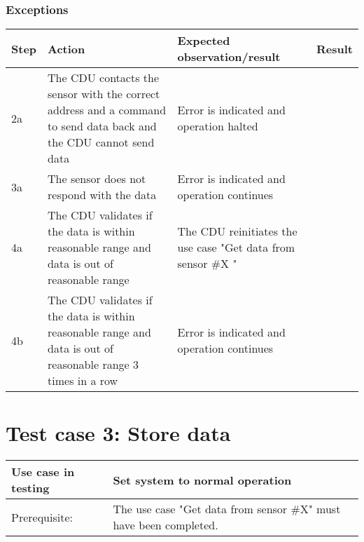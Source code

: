 \subsubsection{Exceptions}
\begin{table}[H]
    \begin{tabular}{|l|p{7cm}|p{5cm}|l|}
    \hline
    Step & Action & Expected observation/result & Result \\ \hline
    2a & The CDU contacts the sensor with the correct address and a command to send data back and the CDU cannot send data & Error is indicated and operation halted & ~ \\ \hline
    3a & The sensor does not respond with the data & Error is indicated and operation continues & ~ \\ \hline
    4a & The CDU validates if the data is within reasonable range and data is out of reasonable range & The CDU reinitiates the use case "Get data from sensor \#X " & ~ \\ \hline
    4b & The CDU validates if the data is within reasonable range and data is out of reasonable range 3 times in a row & Error is indicated and operation continues & ~ \\ \hline
    \end{tabular}
\end{table}

\section{Test case 3: Store data}
\begin{table}[H]
    \begin{tabular}{|l|p{7cm}|}
    \hline
    Use case in testing & Set system to normal operation \\ \hline
    Prerequisite: & The use case "Get data from sensor \#X" must have been completed. \\ \hline
    \end{tabular}
\end{table}

